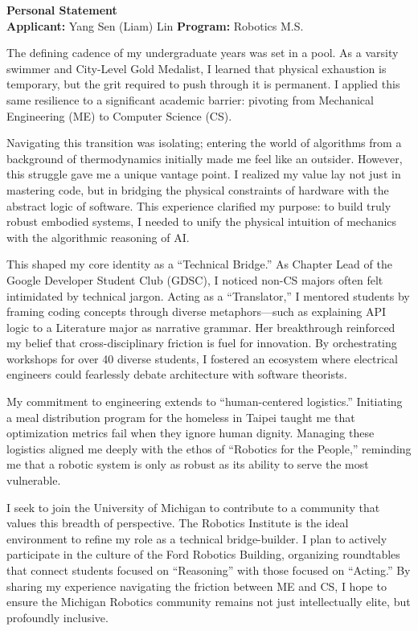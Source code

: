 \documentclass[12pt]{article}
\begin{document}
\begin{center}
    {\Large \textbf{Personal Statement}} \\
    \vspace{1em}
    \textbf{Applicant:} Yang Sen (Liam) Lin \hfill \textbf{Program:} Robotics M.S.
\end{center}
\vspace{1em}

The defining cadence of my undergraduate years was set in a pool. As a varsity swimmer and City-Level Gold Medalist, I learned that physical exhaustion is temporary, but the grit required to push through it is permanent. I applied this same resilience to a significant academic barrier: pivoting from Mechanical Engineering (ME) to Computer Science (CS).

Navigating this transition was isolating; entering the world of algorithms from a background of thermodynamics initially made me feel like an outsider. However, this struggle gave me a unique vantage point. I realized my value lay not just in mastering code, but in bridging the physical constraints of hardware with the abstract logic of software. This experience clarified my purpose: to build truly robust embodied systems, I needed to unify the physical intuition of mechanics with the algorithmic reasoning of AI.

This shaped my core identity as a ``Technical Bridge.'' As Chapter Lead of the Google Developer Student Club (GDSC), I noticed non-CS majors often felt intimidated by technical jargon. Acting as a ``Translator,'' I mentored students by framing coding concepts through diverse metaphors---such as explaining API logic to a Literature major as narrative grammar. Her breakthrough reinforced my belief that cross-disciplinary friction is fuel for innovation. By orchestrating workshops for over 40 diverse students, I fostered an ecosystem where electrical engineers could fearlessly debate architecture with software theorists.

My commitment to engineering extends to ``human-centered logistics.'' Initiating a meal distribution program for the homeless in Taipei taught me that optimization metrics fail when they ignore human dignity. Managing these logistics aligned me deeply with the ethos of ``Robotics for the People,'' reminding me that a robotic system is only as robust as its ability to serve the most vulnerable.

I seek to join the University of Michigan to contribute to a community that values this breadth of perspective. The Robotics Institute is the ideal environment to refine my role as a technical bridge-builder. I plan to actively participate in the culture of the Ford Robotics Building, organizing roundtables that connect students focused on ``Reasoning'' with those focused on ``Acting.'' By sharing my experience navigating the friction between ME and CS, I hope to ensure the Michigan Robotics community remains not just intellectually elite, but profoundly inclusive.
\end{document}
